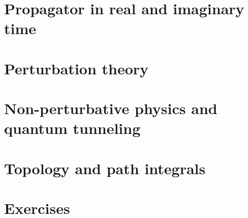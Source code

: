 \documentclass{book}
\theoremstyle{definition}
\begin{document}
\newpage
\section{Propagator in real and imaginary time}


\newpage

\section{Perturbation theory}


\newpage

\section{Non-perturbative physics and quantum tunneling}


\newpage


\section{Topology and path integrals}


\newpage




\section{Exercises}
\end{document}
